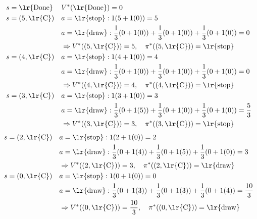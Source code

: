 \begin{ابجد}
\begin{align*}
     & s = \text{\lr{Done}}   &  & V^*(\text{\lr{Done}}) = 0                                                                               \\
     & s = (5, \text{\lr{C}}) &  & a=\text{\lr{stop}}: 1(5 + 1(0)) = 5                                                                     \\
     &                        &  & a=\text{\lr{draw}}: \frac{1}{3}(0 + 1(0)) + \frac{1}{3}(0 + 1(0)) + \frac{1}{3}(0 + 1(0)) = 0           \\
     &                        &  & \Rightarrow V^*((5, \text{\lr{C}})) = 5, \quad \pi^*((5, \text{\lr{C}})) = \text{\lr{stop}}             \\
     & s = (4, \text{\lr{C}}) &  & a=\text{\lr{stop}}: 1(4 + 1(0)) = 4                                                                     \\
     &                        &  & a=\text{\lr{draw}}: \frac{1}{3}(0 + 1(0)) + \frac{1}{3}(0 + 1(0)) + \frac{1}{3}(0 + 1(0)) = 0           \\
     &                        &  & \Rightarrow V^*((4, \text{\lr{C}})) = 4, \quad \pi^*((4, \text{\lr{C}})) = \text{\lr{stop}}             \\
     & s = (3, \text{\lr{C}}) &  & a=\text{\lr{stop}}: 1(3 + 1(0)) = 3                                                                     \\
     &                        &  & a=\text{\lr{draw}}: \frac{1}{3}(0 + 1(5)) + \frac{1}{3}(0 + 1(0)) + \frac{1}{3}(0 + 1(0)) = \frac{5}{3} \\
     &                        &  & \Rightarrow V^*((3, \text{\lr{C}})) = 3, \quad \pi^*((3, \text{\lr{C}})) = \text{\lr{stop}}
\end{align*}
\begin{align*}
     & s = (2, \text{\lr{C}}) &  & a=\text{\lr{stop}}: 1(2 + 1(0)) = 2                                                                      \\
     &                        &  & a=\text{\lr{draw}}: \frac{1}{3}(0 + 1(4)) + \frac{1}{3}(0 + 1(5)) + \frac{1}{3}(0 + 1(0)) = 3            \\
     &                        &  & \Rightarrow V^*((2, \text{\lr{C}})) = 3, \quad \pi^*((2, \text{\lr{C}})) = \text{\lr{draw}}              \\
     & s = (0, \text{\lr{C}}) &  & a=\text{\lr{stop}}: 1(0 + 1(0)) = 0                                                                      \\
     &                        &  & a=\text{\lr{draw}}: \frac{1}{3}(0 + 1(3)) + \frac{1}{3}(0 + 1(3)) + \frac{1}{3}(0 + 1(4)) = \frac{10}{3} \\
     &                        &  & \Rightarrow V^*((0, \text{\lr{C}})) = \frac{10}{3}, \quad \pi^*((0, \text{\lr{C}})) = \text{\lr{draw}}
\end{align*}


\end{ابجد}
